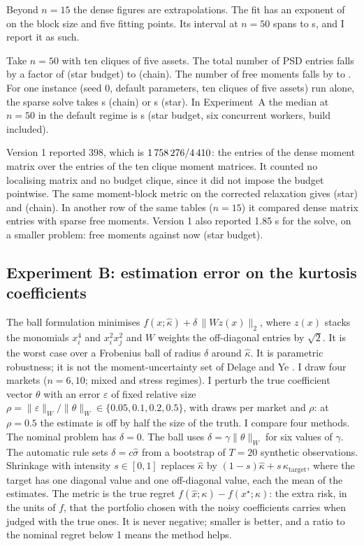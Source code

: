 \documentclass[11pt,a4paper]{article}
\begin{document}
Beyond $n=15$ the dense figures are extrapolations.
The fit has an exponent of \dbExpTime{} on the block size and five fitting points.
Its interval at $n=50$ spans \dbExtTimeLoFifty{} to \dbExtTimeHiFifty{} s, and I report it as such.

Take $n=50$ with ten cliques of five assets.
The total number of PSD entries falls by a factor of \cxPsdStar{} (star budget) to \cxPsdChain{} (chain).
The number of free moments falls by \cxMomStar{} to \cxMomChain{}.
For one instance (seed 0, default parameters, ten cliques of five assets) run alone, the sparse solve takes \cxTimeChain{} s (chain) or \cxTimeStar{} s (star).
In Experiment~A the median at $n=50$ in the default regime is \aTimeSosDef{} s (star budget, six concurrent workers, build included).

Version 1 reported 398, which is $1\,758\,276/4\,410$: the entries of the dense moment matrix over the entries of the ten clique moment matrices.
It counted no localising matrix and no budget clique, since it did not impose the budget pointwise.
The same moment-block metric on the corrected relaxation gives \cxBlkStar{} (star) and \cxBlkChain{} (chain).
In another row of the same tables ($n=15$) it compared dense matrix entries with sparse free moments.
Version 1 also reported 1.85 s for the solve, on a smaller problem: \vSparseMom{} free moments against \cxUniqStar{} now (star budget).

\subsection{Experiment B: estimation error on the kurtosis coefficients}
The ball formulation minimises $f(x;\hat\kappa)+\delta\,\|Wz(x)\|_2$, where $z(x)$ stacks the monomials $x_i^4$ and $x_i^2x_j^2$ and $W$ weights the off-diagonal entries by $\sqrt2$.
It is the worst case over a Frobenius ball of radius $\delta$ around $\hat\kappa$.
It is parametric robustness; it is not the moment-uncertainty set of Delage and Ye \cite{delage2010}.
I draw four markets ($n=6,10$; mixed and stress regimes).
I perturb the true coefficient vector $\theta$ with an error $\varepsilon$ of fixed relative size $\rho=\|\varepsilon\|_W/\|\theta\|_W\in\{0.05,0.1,0.2,0.5\}$, with \bDraws{} draws per market and $\rho$: at $\rho=0.5$ the estimate is off by half the size of the truth.
I compare four methods.
The nominal problem has $\delta=0$.
The ball uses $\delta=\gamma\|\theta\|_W$ for six values of $\gamma$.
The automatic rule sets $\delta=c\hat\sigma$ from a bootstrap of $T=20$ synthetic observations.
Shrinkage with intensity $s\in[0,1]$ replaces $\hat\kappa$ by $(1-s)\hat\kappa+s\,\kappa_{\mathrm{target}}$, where the target has one diagonal value and one off-diagonal value, each the mean of the estimates.
The metric is the true regret $f(\hat x;\kappa)-f(x^\star;\kappa)$: the extra risk, in the units of $f$, that the portfolio chosen with the noisy coefficients carries when judged with the true ones.
It is never negative; smaller is better, and a ratio to the nominal regret below 1 means the method helps.
\end{document}

